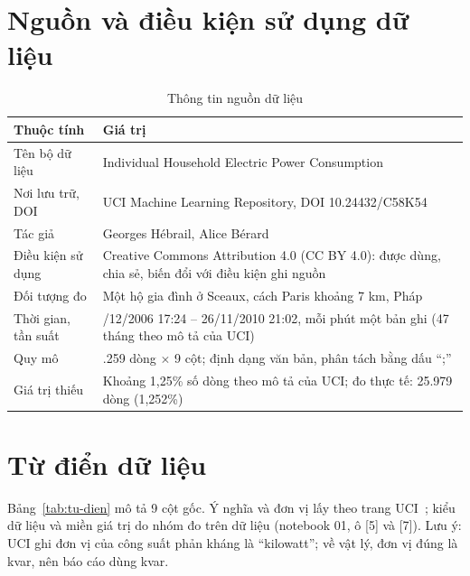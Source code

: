 \documentclass[../main.tex]{subfiles}
\begin{document}
\section{Nguồn và điều kiện sử dụng dữ liệu}

\begin{table}[H]
\centering
\caption{Thông tin nguồn dữ liệu}
\label{tab:nguon}
\begin{tabular}{|>{\raggedright\arraybackslash}p{4cm}|>{\raggedright\arraybackslash}p{10.5cm}|}
\hline
\textbf{Thuộc tính} & \textbf{Giá trị} \\
\hline
Tên bộ dữ liệu & Individual Household Electric Power Consumption~\cite{hebrail2006uci} \\
\hline
Nơi lưu trữ, DOI & UCI Machine Learning Repository, DOI 10.24432/C58K54 \\
\hline
Tác giả & Georges Hébrail, Alice Bérard \\
\hline
Điều kiện sử dụng & Creative Commons Attribution 4.0 (CC BY 4.0): được dùng, chia sẻ, biến đổi với điều kiện ghi nguồn \\
\hline
Đối tượng đo & Một hộ gia đình ở Sceaux, cách Paris khoảng 7 km, Pháp \\
\hline
Thời gian, tần suất & 16/12/2006 17:24 -- 26/11/2010 21:02, mỗi phút một bản ghi (47 tháng theo mô tả của UCI) \\
\hline
Quy mô & 2.075.259 dòng $\times$ 9 cột; định dạng văn bản, phân tách bằng dấu ``;'' \\
\hline
Giá trị thiếu & Khoảng 1,25\% số dòng theo mô tả của UCI; đo thực tế: 25.979 dòng (1,252\%) \\
\hline
\end{tabular}
\end{table}

\section{Từ điển dữ liệu}
Bảng~\ref{tab:tu-dien} mô tả 9 cột gốc. Ý nghĩa và đơn vị lấy theo trang UCI~\cite{hebrail2006uci}; kiểu dữ liệu và miền giá trị do nhóm đo trên dữ liệu (notebook 01, ô [5] và [7]). Lưu ý: UCI ghi đơn vị của công suất phản kháng là ``kilowatt''; về vật lý, đơn vị đúng là kvar, nên báo cáo dùng kvar.
\end{document}
